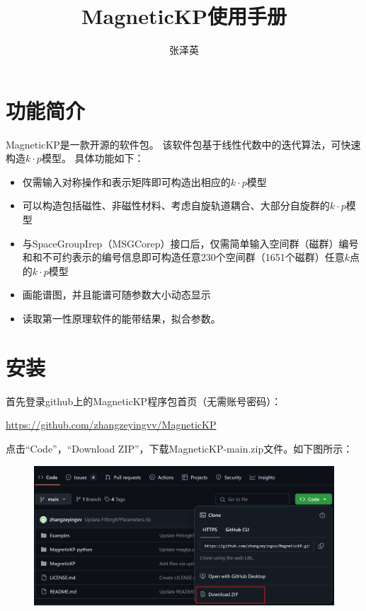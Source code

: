 \documentclass[titlepage,a4paper,12pt,AutoFakeBold]{article}
\begin{document}
\title{\textsf{MagneticKP}使用手册}
\author{张泽英}

\maketitle


\tableofcontents

\newpage

\section{功能简介}
\textsf{MagneticKP}是一款开源的软件包。
该软件包基于线性代数中的迭代算法，可快速构造$k\cdot p$模型。
具体功能如下：
\begin{itemize}
\item   仅需输入对称操作和表示矩阵即可构造出相应的$k\cdot p$模型
\item	可以构造包括磁性、非磁性材料、考虑自旋轨道耦合、大部分自旋群的$k\cdot p$模型
\item	与\textsf{SpaceGroupIrep}（\textsf{MSGCorep}）接口后，仅需简单输入空间群（磁群）编号和和不可约表示的编号信息即可构造任意230个空间群（1651个磁群）任意$k$点的$k\cdot p$模型
\item	画能谱图，并且能谱可随参数大小动态显示
\item	读取第一性原理软件的能带结果，拟合参数。
\end{itemize}


\section{安装}

  首先登录github上的\textsf{MagneticKP}程序包首页（无需账号密码）：
\begin{center}
\url{https://github.com/zhangzeyingvv/MagneticKP}
\end{center}
点击“Code”，“Download ZIP”，下载MagneticKP-main.zip文件。如下图所示：
\begin{figure}[h]
\includegraphics[width=1\textwidth]{./figures/安装1}
\end{figure}
\end{document}
